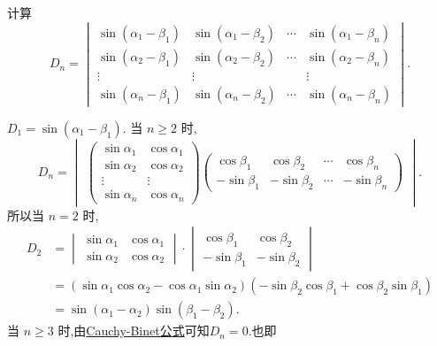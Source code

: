 \documentclass[../../main.tex]{subfiles}
\begin{document}
\begin{example}
计算
\[
D_n = \begin{vmatrix} \sin(\alpha_1 - \beta_1) & \sin(\alpha_1 - \beta_2) & \cdots & \sin(\alpha_1 - \beta_n) \\ \sin(\alpha_2 - \beta_1) & \sin(\alpha_2 - \beta_2) & \cdots & \sin(\alpha_2 - \beta_n) \\ \vdots & \vdots & & \vdots \\ \sin(\alpha_n - \beta_1) & \sin(\alpha_n - \beta_2) & \cdots & \sin(\alpha_n - \beta_n) \end{vmatrix}.
\]
\end{example}
\begin{solution}
\(D_1 = \sin(\alpha_1 - \beta_1)\). 当 \(n \geqslant 2\) 时,
\[
D_n = \begin{vmatrix} \begin{pmatrix} \sin \alpha_1 & \cos \alpha_1 \\ \sin \alpha_2 & \cos \alpha_2 \\ \vdots & \vdots \\ \sin \alpha_n & \cos \alpha_n \end{pmatrix} \begin{pmatrix} \cos \beta_1 & \cos \beta_2 & \cdots & \cos \beta_n \\ -\sin \beta_1 & -\sin \beta_2 & \cdots & -\sin \beta_n \end{pmatrix} \end{vmatrix}.
\]
所以当 \(n = 2\) 时,
\[
\begin{aligned}
D_2 &= \begin{vmatrix} \sin \alpha_1 & \cos \alpha_1 \\ \sin \alpha_2 & \cos \alpha_2 \end{vmatrix} \cdot \begin{vmatrix} \cos \beta_1 & \cos \beta_2 \\ -\sin \beta_1 & -\sin \beta_2 \end{vmatrix} \\
&= (\sin \alpha_1 \cos \alpha_2 - \cos \alpha_1 \sin \alpha_2)(-\sin \beta_2 \cos \beta_1 + \cos \beta_2 \sin \beta_1) \\
&= \sin(\alpha_1 - \alpha_2) \sin(\beta_1 - \beta_2).
\end{aligned}
\]
当 \(n \geqslant 3\) 时,由\hyperref[theorem:Cauchy-Binet公式]{Cauchy-Binet公式}可知$D_n=0.$也即
\[
\begin{aligned}

\end{aligned}\]
\end{solution}
\end{document}

